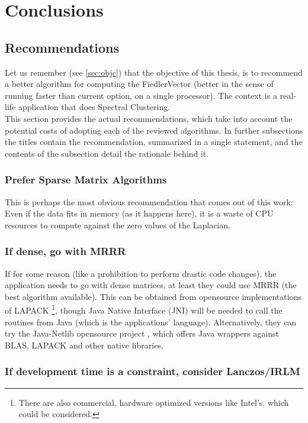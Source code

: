 \chapter{Conclusions}
\label{cha:conclu}

\section{Recommendations}
Let us remember (see \cref{sec:objc}) that the objective of this
thesis, is to recommend a 
better algorithm for computing the \gls{FiedlerVector} (better in the
sense of running faster than current option, on a single
processor). The context is a real-life application that does Spectral
Clustering. \\ 

This section provides the actual recommendations, which take into
account the potential costs of adopting each of the reviewed
algorithms. In further subsections the titles contain the
recommendation, summarized in a single statement, and the contents of
the subsection detail the rationale behind it.

\subsection{Prefer Sparse Matrix Algorithms}

This is perhaps the most obvious recommendation that comes out of this
work: Even if the data fits in memory (as it happens here), it is a waste
of CPU resources to compute against the zero values of the \gls{Laplacian}.

\subsection{If dense, go with \gls{MRRR}}

If for some reason (like a prohibition to perform drastic code
changes), the application needs to go with dense matrices, at least
they could use \gls{MRRR} (the best algorithm available). This can
be obtained from opensource implementations of LAPACK \footnote{There
  are also commercial, hardware optimized versions like Intel's, which
  could be considered.}, though Java
Native Interface (JNI) will be needed to call the routines from Java (which
is the applications' language). Alternatively, they can try the
Java-Netlib opensource project \cite{jnetlib}, which offers Java
wrappers against BLAS, LAPACK and other native libraries.

\subsection{If development time is a constraint, consider Lanczos/\gls{IRLM}}

